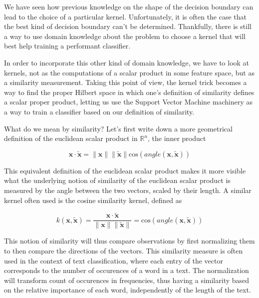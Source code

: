 We have seen how previous knowledge on the shape of the decision boundary can lead to the choice of a particular kernel. Unfortunately, it is often the case that the best kind of decision boundary can't be determined. Thankfully, there is still a way to use domain knowledge about the problem to choose a kernel that will best help training a performant classifier.


In order to incorporate this other kind of domain knowledge, we have to look at kernels, not as the computations of a scalar product in some feature space, but as a similarity measurement. Taking this point of view, the kernel trick becomes a way to find the proper Hilbert space in which one's definition of similarity defines a scalar proper product, letting us use the Support Vector Machine machinery as a way to train a classifier based on our definition of similarity.

What do we mean by similarity? Let's first write down a more geometrical  definition of the euclidean scalar product in $\mathbb{R}^n$, the inner product 

\begin{equation*}
  \mathbf{x} \cdot \mathbf{\tilde{x}} = \|\mathbf{x}\|\|\mathbf{\tilde{x}}\|\text{cos}\left(angle\left(\mathbf{x}, \mathbf{\tilde{x}}\right)
  \right)
\end{equation*}

This equivalent definition of the euclidean scalar product makes it more visible what the underlying notion of similarity of the euclidean scalar product is measured by the angle between the two vectors, scaled by their length. A similar kernel often used is the cosine similarity kernel, defined as

\begin{equation*}
  k(\mathbf{x}, \mathbf{\tilde{x}}) = \frac{\mathbf{x} \cdot \mathbf{\tilde{x}}}{\|\mathbf{x}\|\|\mathbf{\tilde{x}}\|} = \text{cos}\left(angle\left(\mathbf{x}, \mathbf{\tilde{x}}\right)\right)
\end{equation*}

This notion of similarity will thus compare observations by first normalizing them to then compare the directions of the vectors. This similarity measure is often used in the context of text classification, where each entry of the vector corresponds to the number of occurences of a word in a text. The normalization will transform count of occurences in frequencies, thus having a similarity based on the relative importance of each word, independently of the length of the text.


